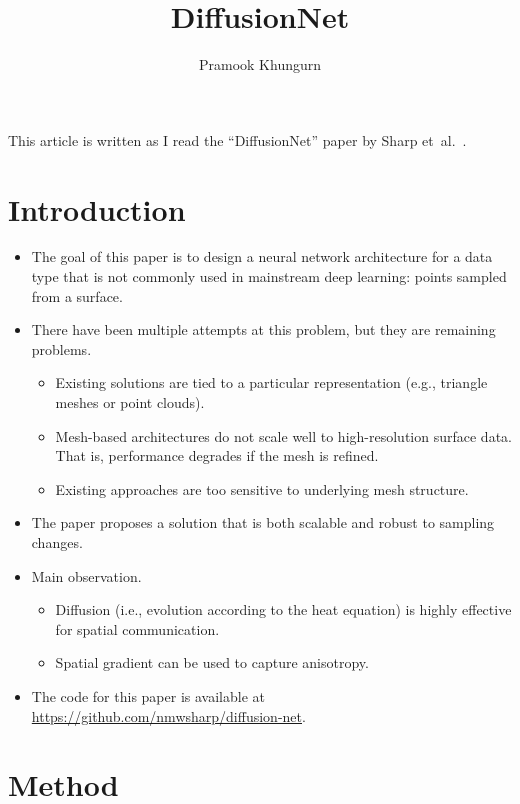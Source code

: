 \documentclass[10pt]{article}
\title{DiffusionNet}
\author{Pramook Khungurn}
\newcommand{\etal}{{et~al.}}
\begin{document}
\maketitle

This article is written as I read the ``DiffusionNet'' paper by Sharp \etal~\cite{Sharp:2022:DiffusionNet}.

\section{Introduction}

\begin{itemize}
  \item The goal of this paper is to design a neural network architecture for a data type that is not commonly used in mainstream deep learning: points sampled from a surface.
  
  \item There have been multiple attempts at this problem, but they are remaining problems.
  \begin{itemize}
    \item Existing solutions are tied to a particular representation (e.g., triangle meshes or point clouds).
    \item Mesh-based architectures do not scale well to high-resolution surface data. That is, performance degrades if the mesh is refined.
    \item Existing approaches are too sensitive to underlying mesh structure.    
  \end{itemize}

  \item The paper proposes a solution that is both scalable and robust to sampling changes.
  
  \item Main observation.
  \begin{itemize}
    \item Diffusion (i.e., evolution according to the heat equation) is highly effective for spatial communication.
    \item Spatial gradient can be used to capture anisotropy.
  \end{itemize}    

  \item The code for this paper is available at \url{https://github.com/nmwsharp/diffusion-net}.
\end{itemize}

\section{Method}
\end{document}
